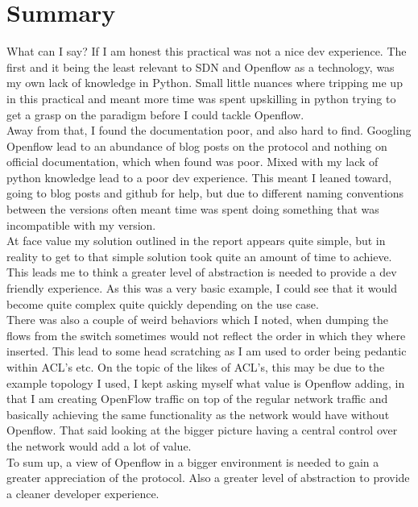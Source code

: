 \section{Summary}
What can I say? If I am honest this practical was not a nice dev experience. The first and it being the least relevant to SDN and Openflow as a technology, was my own lack of knowledge in Python. Small little nuances where tripping me up in this practical and meant more time was spent upskilling in python trying to get a grasp on the paradigm before I could tackle Openflow.
\\Away from that, I found the documentation poor, and also hard to find. Googling Openflow lead to an abundance of blog posts on the protocol and nothing on official documentation, which when found was poor. Mixed with my lack of python knowledge lead to a poor dev experience. This meant I leaned toward, going to blog posts and github for help, but due to different naming conventions between the versions often meant time was spent doing something that was incompatible with my version.
\\At face value my solution outlined in the report appears quite simple, but in reality to get to that simple solution took quite an amount of time to achieve. This leads me to think a greater level of abstraction is needed to provide a dev friendly experience. As this was a very basic example, I could see that it would become quite complex quite quickly depending on the use case. 
\\There was also a couple of weird behaviors which I noted, when dumping the flows from the switch sometimes would not reflect the order in which they where inserted. This lead to some head scratching as I am used to order being pedantic within ACL's etc. On the topic of the likes of ACL's, this may be due to the example topology I used, I kept asking myself what value is Openflow adding, in that I am creating OpenFlow traffic on top of the regular network traffic and basically achieving the same functionality as the network would have without Openflow. That said looking at the bigger picture having a central control over the network would add a lot of value. 
\\To sum up, a view of Openflow in a bigger environment is needed to gain a greater appreciation of the protocol. Also a greater level of abstraction to provide a cleaner developer experience.
